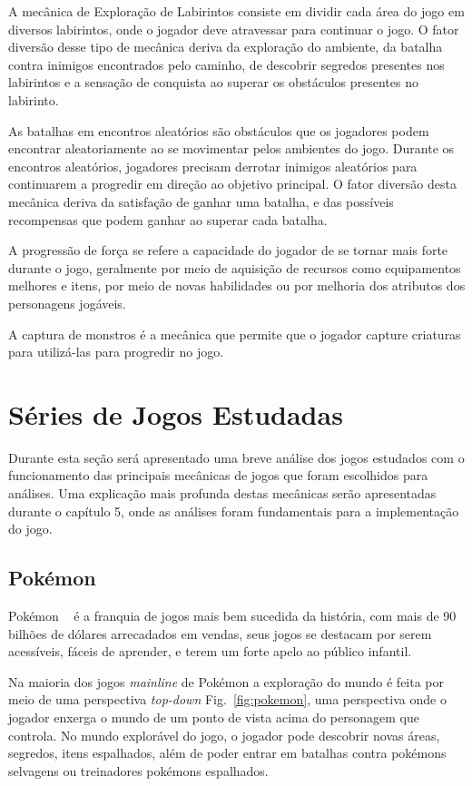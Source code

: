	A mecânica de Exploração de Labirintos consiste em dividir cada área do jogo em diversos labirintos, onde o jogador deve atravessar para continuar o jogo. O fator diversão desse tipo de mecânica deriva da exploração do ambiente, da batalha contra inimigos encontrados pelo caminho, de descobrir segredos presentes nos labirintos e a sensação de conquista ao superar os obstáculos presentes no labirinto. 

	As batalhas em encontros aleatórios são obstáculos que os jogadores podem encontrar aleatoriamente ao se movimentar pelos ambientes do jogo. Durante os encontros aleatórios, jogadores precisam derrotar inimigos aleatórios para continuarem a progredir em direção ao objetivo principal. O fator diversão desta mecânica deriva da satisfação de ganhar uma batalha, e das possíveis recompensas que podem ganhar ao superar cada batalha.

	A progressão de força se refere a capacidade do jogador de se tornar mais forte durante o jogo, geralmente por meio de aquisição de recursos como equipamentos melhores e itens, por meio de novas habilidades ou por melhoria dos atributos dos personagens jogáveis. 

	A captura de monstros é a mecânica que permite que o jogador capture criaturas para utilizá-las para progredir no jogo.

\section{Séries de Jogos Estudadas}

Durante esta seção será apresentado uma breve análise dos jogos estudados com o funcionamento das principais mecânicas de jogos que foram escolhidos para análises. Uma explicação mais profunda destas mecânicas serão apresentadas durante o capítulo 5, onde as análises foram fundamentais para a implementação do jogo.

\subsection{Pokémon}

Pokémon ~\cite{Pkmn} é a franquia de jogos mais bem sucedida da história, com mais de 90 bilhões de dólares arrecadados em vendas, seus jogos se destacam por serem acessíveis, fáceis de aprender, e terem um forte apelo ao público infantil.

Na maioria dos jogos \emph{mainline} de Pokémon a exploração do mundo é feita por meio de uma perspectiva \emph{top-down} Fig.~\ref{fig:pokemon}, uma perspectiva onde o jogador enxerga o mundo de um ponto de vista acima do personagem que controla. No mundo explorável do jogo, o jogador pode descobrir novas áreas, segredos, itens espalhados, além de poder entrar em batalhas contra pokémons selvagens ou treinadores pokémons espalhados.

